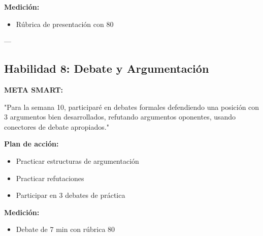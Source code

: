 \documentclass[a4paper,11pt]{article}
\begin{document}
\vspace{0.2cm}

\textbf{Medición:}

\begin{itemize}

  \item [ ] Rúbrica de presentación con 80%

\end{itemize}

\vspace{0.2cm}

---

\vspace{0.2cm}

\subsection{Habilidad 8: Debate y Argumentación}

\vspace{0.2cm}

\textbf{META SMART:}

"Para la semana 10, participaré en debates formales defendiendo una posición con 3 argumentos bien desarrollados, refutando argumentos oponentes, usando conectores de debate apropiados."

\vspace{0.2cm}

\textbf{Plan de acción:}

\begin{itemize}

  \item Practicar estructuras de argumentación

  \item Practicar refutaciones

  \item Participar en 3 debates de práctica

\end{itemize}

\vspace{0.2cm}

\textbf{Medición:}

\begin{itemize}

  \item [ ] Debate de 7 min con rúbrica 80%

\end{itemize}

\vspace{0.2cm}
\end{document}
